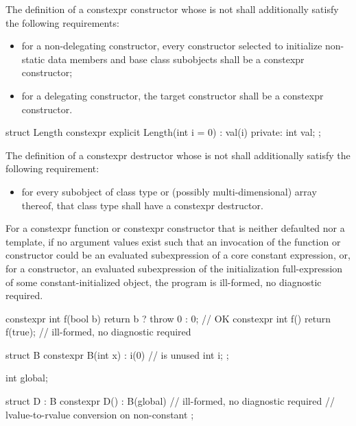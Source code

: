 \pnum
{}%
The definition of a constexpr constructor
whose  is not 
shall additionally satisfy the following requirements:
\begin{itemize}

\item
for a non-delegating constructor, every constructor selected to initialize non-static
data members and base class subobjects shall be a constexpr constructor;

\item
for a delegating constructor, the target constructor shall be a constexpr
constructor.
\end{itemize}

\begin{example}
\begin{codeblock}
struct Length {
  constexpr explicit Length(int i = 0) : val(i) { }
private:
  int val;
};
\end{codeblock}
\end{example}

\pnum
The definition of a constexpr destructor
whose  is not 
shall additionally satisfy the following requirement:
\begin{itemize}
\item
  for every subobject of class type or
  (possibly multi-dimensional) array thereof,
  that class type shall have a constexpr destructor.
\end{itemize}

\pnum
For a constexpr function or constexpr constructor
that is neither defaulted nor a template,
if no argument values exist such that
an invocation of the function or constructor could be an evaluated subexpression of a core
constant expression, or,
for a constructor, an evaluated subexpression of
the initialization full-expression of some constant-initialized object,
the program is ill-formed, no diagnostic required.
\begin{example}
\begin{codeblock}
constexpr int f(bool b)
  { return b ? throw 0 : 0; }           // OK
constexpr int f() { return f(true); }   // ill-formed, no diagnostic required

struct B {
  constexpr B(int x) : i(0) { }         //  is unused
  int i;
};

int global;

struct D : B {
  constexpr D() : B(global) { }         // ill-formed, no diagnostic required
                                        // lvalue-to-rvalue conversion on non-constant 
};
\end{codeblock}
\end{example}

